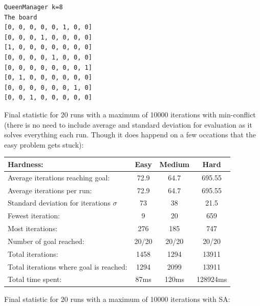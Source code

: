 \documentclass[12pt, a4paper]{article}
\begin{document}
\begin{verbatim}
QueenManager k=8
The board 
[0, 0, 0, 0, 0, 1, 0, 0]
[0, 0, 0, 1, 0, 0, 0, 0]
[1, 0, 0, 0, 0, 0, 0, 0]
[0, 0, 0, 0, 1, 0, 0, 0]
[0, 0, 0, 0, 0, 0, 0, 1]
[0, 1, 0, 0, 0, 0, 0, 0]
[0, 0, 0, 0, 0, 0, 1, 0]
[0, 0, 1, 0, 0, 0, 0, 0]

\end{verbatim}
\noindent
Final statistic for 20 runs with a maximum of 10000 iterations with min-conflict (there is no need to include average and standard deviation for evaluation as it solves everything each run. Though it does happend on a few occations that the easy problem gets stuck):\\
\begin{center}
  \begin{tabular}{| l | c c c|}
    \hline
    Hardness: &\textbf{Easy} & \textbf{Medium} & \textbf{Hard} \\ \hline
    Average iterations reaching goal: & 72.9& 64.7 & 695.55\\
    Average iterations per run:  & 72.9 & 64.7 & 695.55\\
    Standard deviation for iterations $\sigma$ & 73 & 38 & 21.5\\
    Fewest iteration: & 9 & 20& 659\\ 
    Most iterations: & 276 & 185& 747\\ 
    Number of goal reached: & 20/20 & 20/20 & 20/20\\
    Total iterations: & 1458 & 1294& 13911\\
    Total iterations where goal is reached: & 1294 & 2099& 13911\\
    Total time spent: & 87ms & 120ms & 128924ms\\
    \hline
  \end{tabular}
\end{center}
\noindent
Final statistic for 20 runs with a maximum of 10000 iterations with SA:\\
\end{document}

